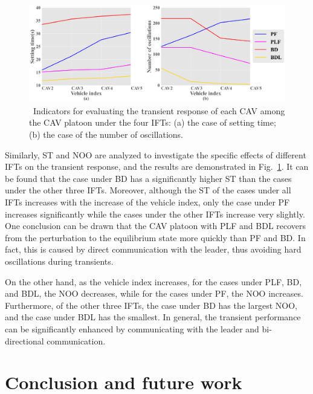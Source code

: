 \documentclass[a4paper]{cas-sc}
\begin{document}
\begin{figure}

  \centering
  \includegraphics[width=14cm]{figs/fig10.png}
  \caption{~Indicators for evaluating the transient response of each CAV among the CAV platoon under the four IFTs: (a) the case of setting time; (b) the case of the number of oscillations.}
  \label{fig10}
\end{figure}

Similarly, ST and NOO are analyzed to investigate the specific effects of different IFTs on the transient response, and the results are demonstrated in Fig.~\ref{fig10}. It can be found that the case under BD has a significantly higher ST than the cases under the other three IFTs. Moreover, although the ST of the cases under all IFTs increases with the increase of the vehicle index, only the case under PF increases significantly while the cases under the other IFTs increase very slightly. One conclusion can be drawn that the CAV platoon with PLF and BDL recovers from the perturbation to the equilibrium state more quickly than PF and BD. In fact, this is caused by direct communication with the leader, thus avoiding hard oscillations during transients.

On the other hand, as the vehicle index increases, for the cases under PLF, BD, and BDL, the NOO decreases, while for the cases under PF, the NOO increases. Furthermore, of the other three IFTs, the case under BD has the largest NOO, and the case under BDL has the smallest. In general, the transient performance can be significantly enhanced by communicating with the leader and bi-directional communication.



\section{Conclusion and future work}
\label{Section 6}
\end{document}
